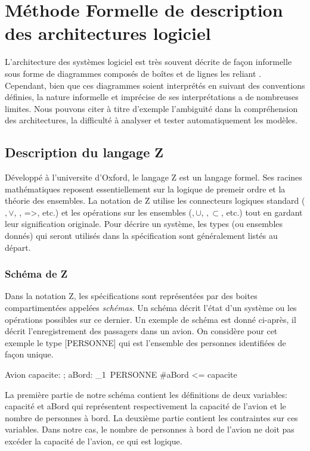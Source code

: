 \chapter{Méthode Formelle de description des architectures logiciel}
L'architecture des systèmes logiciel est très souvent décrite de façon informelle sous forme de diagrammes composés de boîtes et de lignes les reliant \cite{Gregory1995}. Cependant, bien que ces diagrammes soient interprétés en suivant des conventions définies, la nature informelle et imprécise de ses interprétations a de nombreuses limites. Nous pouvons citer à titre d'exemple l'ambiguïté dans la compréhension des architectures, la difficulté à analyser et tester automatiquement les modèles. 
\section{Description du langage  Z}
Développé à l'universite d'Oxford, le langage Z \cite{Gregory1995} est un langage formel. Ses racines mathématiques reposent essentiellement sur la logique de premeir ordre et la théorie des ensembles. La notation de Z utilise les connecteurs logiques standard (\land$, \lor$, \lnot, =>, etc.) et les opérations sur les ensembles (\in$, \cup$, \cap$, \subset$, etc.) tout en gardant leur signification originale. Pour décrire un système, les types (ou ensembles donnés) qui seront utilisés dans la spécification sont généralement listés au départ.

\subsection{Schéma de Z}
Dans la notation Z, les spécifications sont représentées par des boites compartimentées appelées \textit{schémas}. Un schéma décrit l'état d'un système ou les opérations possibles sur ce dernier. Un exemple de schéma est donné ci-après, il décrit l'enregistrement des passagers dans un avion. On considère pour cet exemple le type [PERSONNE] qui est l'ensemble des personnes identifiées de façon unique.

\begin{schema}{Avion}
capacite: \nat; aBord: \power_1~PERSONNE
\where
#aBord <= capacite
\znewpage
\end{schema}

La première partie de notre schéma contient les définitions de deux variables: capacité et aBord qui représentent respectivement la capacité de l'avion et le nombre de personnes à bord. La deuxième partie contient les contraintes sur ces variables. Dans notre cas, le nombre de personnes à bord de l'avion ne doit pas excéder la capacité de l'avion, ce qui est logique. 

